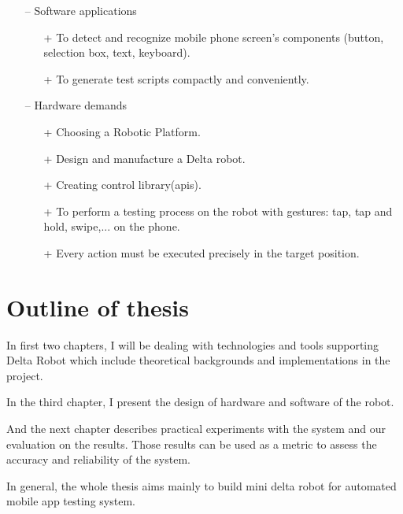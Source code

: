 \begin{itemize}
\item[--] Software applications
	\begin{itemize}
		\item[+] To detect and recognize mobile phone screen's components (button, selection box, text, keyboard).
		\item[+] To generate test scripts compactly and conveniently.
	\end{itemize}
\item[--] Hardware demands
	\begin{itemize}
		\item[+] Choosing a Robotic Platform.
		\item[+] Design and manufacture a Delta robot.
		\item[+] Creating control library(\glspl{api}).
		\item[+] To perform a testing process on the robot with gestures: tap, tap and hold, swipe,... on the phone.
		\item[+] Every action must be executed precisely in the target position.
	\end{itemize}
\end{itemize}

\section{Outline of thesis}

In first two chapters, I will be dealing with technologies and tools supporting Delta Robot which include theoretical backgrounds and implementations in the project.

In the third chapter, I present the design of hardware and software of the robot.

And the next chapter describes practical experiments with the system and our evaluation on the results. Those results can be used as a metric to assess the accuracy and reliability of the system.

In general, the whole thesis aims mainly to build mini delta robot for automated mobile app testing system. \nocite{radim_thesis}